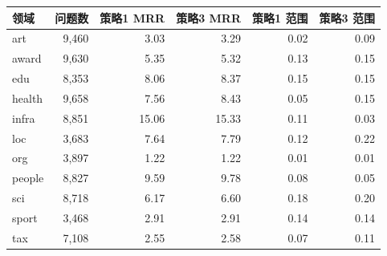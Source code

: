 \begin{tabular}{lrrrrr}
\toprule
领域 & 问题数 & 策略1 MRR & 策略3 MRR & 策略1 范围 & 策略3 范围 \\
\midrule
art & 9,460 & 3.03 & 3.29 & 0.02 & 0.09 \\
award & 9,630 & 5.35 & 5.32 & 0.13 & 0.15 \\
edu & 8,353 & 8.06 & 8.37 & 0.15 & 0.15 \\
health & 9,658 & 7.56 & 8.43 & 0.05 & 0.15 \\
infra & 8,851 & 15.06 & 15.33 & 0.11 & 0.03 \\
loc & 3,683 & 7.64 & 7.79 & 0.12 & 0.22 \\
org & 3,897 & 1.22 & 1.22 & 0.01 & 0.01 \\
people & 8,827 & 9.59 & 9.78 & 0.08 & 0.05 \\
sci & 8,718 & 6.17 & 6.60 & 0.18 & 0.20 \\
sport & 3,468 & 2.91 & 2.91 & 0.14 & 0.14 \\
tax & 7,108 & 2.55 & 2.58 & 0.07 & 0.11 \\
\bottomrule
\end{tabular}
